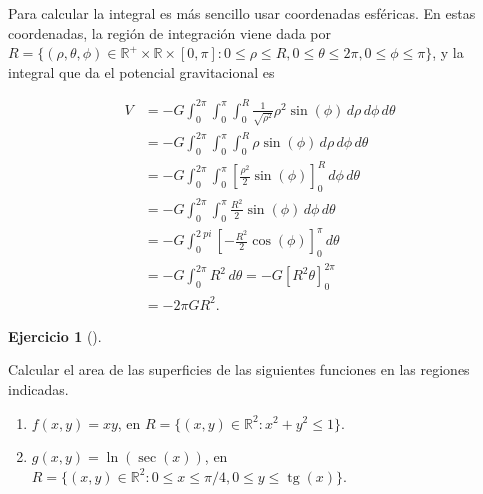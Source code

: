 \documentclass[
  spanish,
  a4paper,
]{scrreport}
\providecommand{\tightlist}{%
  \setlength{\itemsep}{0pt}\setlength{\parskip}{0pt}}
\theoremstyle{definition}
\newtheorem{exercise}{Ejercicio}[chapter]
\theoremstyle{remark}
\begin{document}
\begin{tcolorbox}[enhanced jigsaw, arc=.35mm, bottomrule=.15mm, bottomtitle=1mm, breakable, colback=white, colbacktitle=quarto-callout-tip-color!10!white, colframe=quarto-callout-tip-color-frame, coltitle=black, left=2mm, leftrule=.75mm, opacityback=0, opacitybacktitle=0.6, rightrule=.15mm, title=\textcolor{quarto-callout-tip-color}{\faLightbulb}\hspace{0.5em}{Solución}, titlerule=0mm, toprule=.15mm, toptitle=1mm]

Para calcular la integral es más sencillo usar coordenadas esféricas. En
estas coordenadas, la región de integración viene dada por
\(R=\{(\rho,\theta,\phi)\in\mathbb{R}^+\times\mathbb{R}\times[0,\pi]: 0\leq \rho\leq R, 0\leq \theta\leq 2\pi, 0\leq \phi\leq \pi\}\),
y la integral que da el potencial gravitacional es

\begin{align*}
V
&= -G\int_0^{2\pi} \int_0^{\pi} \int_0^{R} \frac{1}{\sqrt{\rho^2}} \rho^2 \sin(\phi)\,d\rho\,d\phi\,d\theta \\
&= -G\int_0^{2\pi} \int_0^{\pi} \int_0^{R} \rho \sin(\phi)\,d\rho\,d\phi\,d\theta \\
&= -G\int_0^{2\pi} \int_0^{\pi} \left[\frac{\rho^2}{2}\sin(\phi)\right]_0^{R}\,d\phi\,d\theta \\
&= -G\int_0^{2\pi} \int_0^{\pi} \frac{R^2}{2}\sin(\phi)\,d\phi\,d\theta \\
&= -G\int_0^{2\ pi} \left[-\frac{R^2}{2}\cos(\phi)\right]_0^{\pi}\,d\theta \\
&= -G\int_0^{2\pi} R^2\,d\theta 
= -G [R^2\theta]_0^{2\pi} \\
&= -2\pi G R^2.
\end{align*}

\end{tcolorbox}

\begin{exercise}[]\protect\hypertarget{exr-integral-doble-area-superficies}{}\label{exr-integral-doble-area-superficies}

Calcular el area de las superficies de las siguientes funciones en las
regiones indicadas.

\begin{enumerate}
\def\labelenumi{\alph{enumi}.}
\tightlist
\item
  \(f(x,y)=xy\), en \(R=\{(x,y)\in \mathbb{R}^2: x^2+y^2\leq 1\}\).
\item
  \(g(x,y)=\ln(\sec(x))\), en
  \(R=\{(x,y)\in \mathbb{R}^2: 0\leq x\leq \pi/4, 0\leq y\leq \operatorname{tg}(x)\}\).
\end{enumerate}

\end{exercise}
\end{document}
